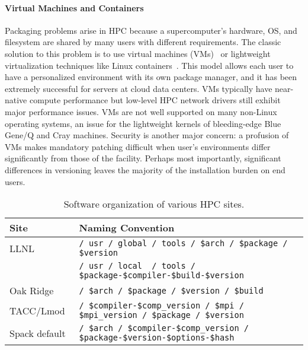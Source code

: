 \paragraph{Virtual Machines and Containers}

Packaging problems arise in HPC because a supercomputer's hardware, OS, and
filesystem are shared by many users with different requirements.  The classic 
solution to this problem is to use virtual
machines (VMs)~\cite{barham2003xen,rosenblum1999vmware,smith2005architecture}
or lightweight virtualization techniques like Linux 
containers~\cite{felter2014updated,merkel2014docker}. This model allows each
 user to have a personalized environment with its own package manager, and it 
has been extremely successful for servers at cloud data centers. VMs typically
have near-native compute performance but low-level HPC network drivers still 
exhibit major performance issues. VMs are not well supported on many
non-Linux operating systems, an issue for the lightweight 
kernels of bleeding-edge Blue Gene/Q and Cray machines. Security
is another major concern: a profusion of VMs makes mandatory patching
difficult when user's environments differ significantly from those of 
the facility. Perhaps most importantly, significant differences in
versioning leaves the majority of the installation burden on end users.

\begin{table*}\centering
\begin{tabular}{|l|l|}
\hline
Site           & Naming Convention \\
\hline
\hline
LLNL       & {\tt / usr / global / tools / \$arch / \$package / \$version} \\
           & {\tt / usr / local~ / tools / \$package-\$compiler-\$build-\$version } \\
\hline
Oak Ridge~\cite{jones+:cug08}  & {\tt / \$arch / \$package / \$version / \$build} \\
\hline
TACC/Lmod~\cite{mclay:lmod-tutorial}& {\tt / \$compiler-\$comp\_version / \$mpi / \$mpi\_version / \$package / \$version} \\
\hline
\hline
Spack default                  & {\tt / \$arch / \$compiler-\$comp\_version / \$package-\$version-\$options-\$hash} \\
\hline
\end{tabular}
\caption{
	Software organization of various HPC sites.
	\label{tab:naming-conventions}
}
\vspace{-15pt}
\end{table*}


